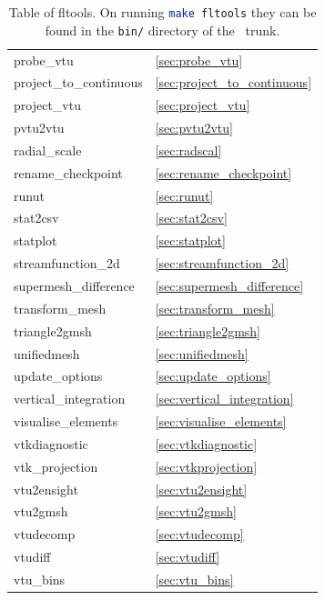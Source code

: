 \begin{table}
\begin{center}
\begin{tabular}{| l | l |}
	probe\_vtu  				& \ref{sec:probe_vtu} 			\\
	project\_to\_continuous			& \ref{sec:project_to_continuous} 	\\
	project\_vtu				& \ref{sec:project_vtu} 		\\
	pvtu2vtu				& \ref{sec:pvtu2vtu}			\\
  radial\_scale                           & \ref{sec:radscal}                     \\
	rename\_checkpoint			& \ref{sec:rename_checkpoint}		\\
	runut           			& \ref{sec:runut}		        \\
	stat2csv				& \ref{sec:stat2csv}			\\
	statplot				& \ref{sec:statplot} 			\\
	streamfunction\_2d			& \ref{sec:streamfunction_2d} 		\\
	supermesh\_difference			& \ref{sec:supermesh_difference} 	\\
	transform\_mesh				& \ref{sec:transform_mesh}		\\
	triangle2gmsh				& \ref{sec:triangle2gmsh}		\\
	unifiedmesh				& \ref{sec:unifiedmesh} 		\\
	update\_options				& \ref{sec:update_options}		\\
	vertical\_integration			& \ref{sec:vertical_integration} 	\\
  visualise\_elements     & \ref{sec:visualise_elements} \\
	vtkdiagnostic				& \ref{sec:vtkdiagnostic}		\\
	vtk\_projection				& \ref{sec:vtkprojection}		\\
  vtu2ensight & \ref{sec:vtu2ensight} \\
	vtu2gmsh & \ref{sec:vtu2gmsh} \\
	vtudecomp				& \ref{sec:vtudecomp}			\\
	vtudiff					& \ref{sec:vtudiff}			\\
	vtu\_bins           			& \ref{sec:vtu_bins}			\\
    \hline
  \end{tabular}
\end{center}
\caption[Table of fltools]{Table of fltools. On running \lstinline[language = bash]+make fltools+ they can be found in the \lstinline[language = bash]+bin/+ directory of the \fluidity\ trunk.}
\label{tab:fltools}
\end{table}

